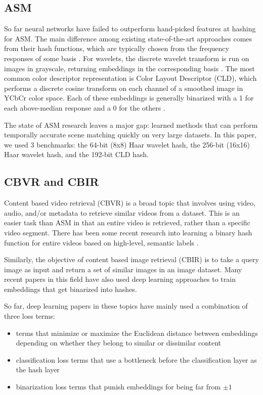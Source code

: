 \documentclass{article}
\begin{document}
\begin{multicols}{2}
\subsection{ASM}

So far neural networks have failed to outperform hand-picked features at hashing for ASM.
The main difference among existing state-of-the-art approaches comes from their hash functions, which are typically chosen from the frequency responses of some basis \cite{cbvr15}.
For wavelets, the discrete wavelet transform is run on images in grayscale, returning embeddings in the corresponding basis \cite{cbvr15}.
The most common color descriptor representation is Color Layout Descriptor (CLD), which performs a discrete cosine transform on each channel of a smoothed image in YCbCr color space.
Each of these embeddings is generally binarized with a 1 for each above-median response and a 0 for the others \cite{cbvir12}.


The state of ASM research leaves a major gap: learned methods that can perform temporally accurate scene matching quickly on very large datasets. In this paper, we used 3 benchmarks: the 64-bit (8x8) Haar wavelet hash, the 256-bit (16x16) Haar wavelet hash, and the 192-bit CLD hash.


\subsection{CBVR and CBIR}

Content based video retrieval (CBVR) is a broad topic that involves using video, audio, and/or metadata to retrieve similar videos from a dataset.
This is an easier task than ASM in that an entire video is retrieved, rather than a specific video segment.
There has been some recent research into learning a binary hash function for entire videos based on high-level, semantic labels \cite{video_deep17, video_mask17}.

Similarly, the objective of content based image retrieval (CBIR) is to take a query image as input and return a set of similar images in an image dataset.
Many recent papers in this field have also used deep learning approaches to train embeddings that get binarized into hashes.

So far, deep learning papers in these topics have mainly used a combination of three loss terms:
\begin{itemize}
\item terms that minimize or maximize the Euclidean distance between embeddings depending on whether they belong to similar or dissimilar content \cite{cnnh14, compact15, supervised16, efficient16, feature16, hashnet17, video_deep17, video_mask17, adversarial17}
\item classification loss terms that use a bottleneck before the classification layer as the hash layer \cite{fast15, semantic17, video_deep17, video_mask17}
\item binarization loss terms that punish embeddings for being far from $\pm1$ \cite{compact15, supervised16, efficient16, feature16, adversarial17}
\end{itemize}


\end{multicols}
\end{document}
